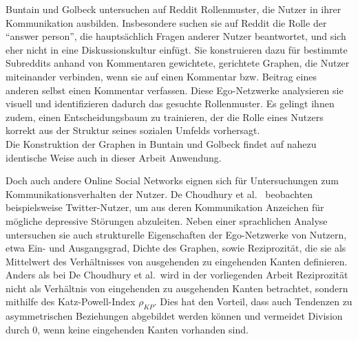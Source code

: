 \documentclass[11pt,a4paper,twoside]{article}
\begin{document}
Buntain und Golbeck \autocite{Buntain2014} untersuchen auf Reddit
Rollenmuster, die Nutzer in ihrer Kommunikation ausbilden. Insbesondere
suchen sie auf Reddit die Rolle der \enquote{answer person}, die
hauptsächlich Fragen anderer Nutzer beantwortet, und sich eher nicht in
eine Diskussionskultur einfügt. Sie konstruieren dazu für bestimmte
Subreddits anhand von Kommentaren gewichtete, gerichtete Graphen, die
Nutzer miteinander verbinden, wenn sie auf einen Kommentar bzw. Beitrag
eines anderen selbst einen Kommentar verfassen. Diese Ego-Netzwerke
analysieren sie visuell und identifizieren dadurch das gesuchte
Rollenmuster. Es gelingt ihnen zudem, einen Entscheidungsbaum zu
trainieren, der die Rolle eines Nutzers korrekt aus der Struktur seines
sozialen Umfelds vorhersagt.\\
Die Konstruktion der Graphen in Buntain und Golbeck findet auf nahezu
identische Weise auch in dieser Arbeit Anwendung.

Doch auch andere Online Social Networks eignen sich für Untersuchungen
zum Kommunikationsverhalten der Nutzer. De Choudhury et
al.~\autocite{DeChoudhury2016} beobachten beispielsweise Twitter-Nutzer,
um aus deren Kommunikation Anzeichen für mögliche depressive Störungen
abzuleiten. Neben einer sprachlichen Analyse untersuchen sie auch
strukturelle Eigenschaften der Ego-Netzwerke von Nutzern, etwa Ein- und
Ausgangsgrad, Dichte des Graphen, sowie Reziprozität, die sie als
Mittelwert des Verhältnisses von ausgehenden zu eingehenden Kanten
definieren. Anders als bei De Choudhury et al.~wird in der vorliegenden
Arbeit Reziprozität nicht als Verhältnis von eingehenden zu ausgehenden
Kanten betrachtet, sondern mithilfe des Katz-Powell-Index \(\rho_{KP}\).
Dies hat den Vorteil, dass auch Tendenzen zu asymmetrischen Beziehungen
abgebildet werden können und vermeidet Division durch 0, wenn keine
eingehenden Kanten vorhanden sind.
\end{document}
